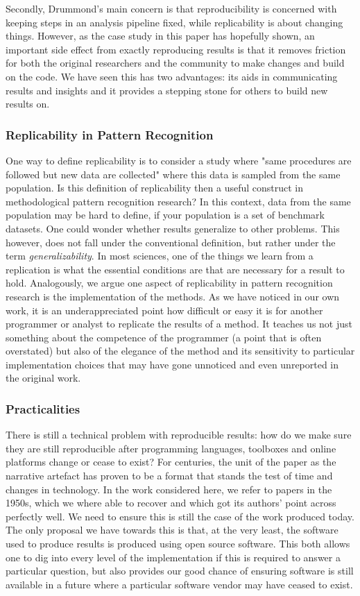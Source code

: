\documentclass[runningheads,a4paper]{llncs}\usepackage[]{graphicx}\usepackage[]{color}
\begin{document}
Secondly, Drummond's main concern is that reproducibility is concerned with keeping steps in an analysis pipeline fixed, while replicability is about changing things. However, as the case study in this paper has hopefully shown, an important side effect from exactly reproducing results is that it removes friction for both the original researchers and the community to make changes and build on the code. We have seen this has two advantages: its aids in communicating results and insights and it provides a stepping stone for others to build new results on.

\subsubsection{Replicability in Pattern Recognition}
One way to define replicability is to consider a study where "same procedures are followed but new data are collected" \cite{Goodman2016a} where this data is sampled from the same population. Is this definition of replicability then a useful construct in methodological pattern recognition research? In this context, data from the same population may be hard to define, if your population is a set of benchmark datasets. One could wonder whether results generalize to other problems. This however, does not fall under the conventional definition, but rather under the term \emph{generalizability}. 
In most sciences, one of the things we learn from a replication is what the essential conditions are that are necessary for a result to hold. Analogously, we argue one aspect of replicability in pattern recognition research is the implementation of the methods. As we have noticed in our own work, it is an underappreciated point how difficult or easy it is for another programmer or analyst to replicate the results of a method. It teaches us not just something about the competence of the programmer (a point that is often overstated) but also of the elegance of the method and its sensitivity to particular implementation choices that may have gone unnoticed and even unreported in the original work.

\subsubsection{Practicalities}
There is still a technical problem with reproducible results: how do we make sure they are still reproducible after programming languages, toolboxes and online platforms change or cease to exist? For centuries, the unit of the paper as the narrative artefact has proven to be a format that stands the test of time and changes in technology. In the work considered here, we refer to papers in the 1950s, which we where able to recover and which got its authors' point across perfectly well. We need to ensure this is still the case of the work produced today. The only proposal we have towards this is that, at the very least, the software used to produce results is produced using open source software. This both allows one to dig into every level of the implementation if this is required to answer a particular question, but also provides our good chance of ensuring software is still available in a future where a particular software vendor may have ceased to exist.
\end{document}

